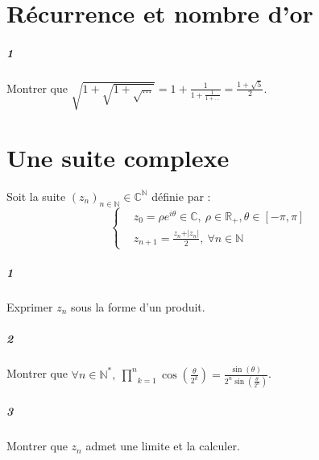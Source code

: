 \documentclass[10pt,a4paper]{article}
\begin{document}
\section{Récurrence et nombre d'or}
\subparagraph{1}Montrer que $\sqrt{1+\sqrt{1+\sqrt{\dots}}}=1+\frac{1}{1+\frac{1}{1+\dots}}=\frac{1+\sqrt{5}}{2}$.

\section{Une suite complexe}
Soit la suite $(z_n)_{n \in \mathbb{N}} \in \mathbb{C}^{\mathbb{N}}$ définie par :
\begin{equation*}
\left\lbrace\begin{aligned}
&z_0=\rho e^{i\theta} \in \mathbb{C}, \ \rho \in \mathbb{R}_+, \theta \in [-\pi,\pi] \\
&z_{n+1}=\frac{z_n+\vert z_n \vert}{2}, \ \forall n \in \mathbb{N}
\end{aligned} \right.
\end{equation*}
\subparagraph{1}Exprimer $z_n$ sous la forme d'un produit.
\subparagraph{2}Montrer que $\forall n \in \mathbb{N}^*, \ \underset{k=1}{\overset{n}{\prod}}\cos(\frac{\theta}{2^k})=\frac{\sin(\theta)}{2^n\sin(\frac{\theta}{2^n})}$.
\subparagraph{3}Montrer que $z_n$ admet une limite et la calculer.
\end{document}
